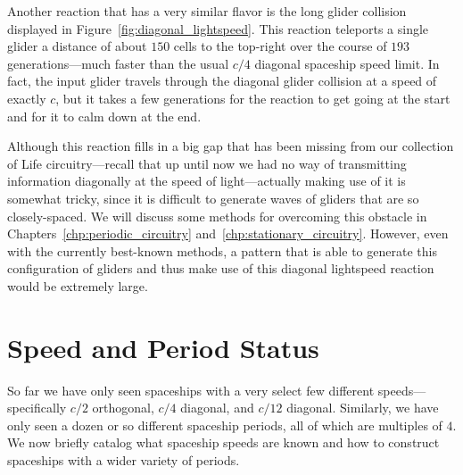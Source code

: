 Another reaction that has a very similar flavor is the long glider collision displayed in Figure~\ref{fig:diagonal_lightspeed}. This reaction teleports a single glider a distance of about $150$ cells to the top-right over the course of $193$ generations---much faster than the usual $c/4$ diagonal spaceship speed limit. In fact, the input glider travels through the diagonal glider collision at a speed of exactly $c$, but it takes a few generations for the reaction to get going at the start and for it to calm down at the end.

Although this reaction fills in a big gap that has been missing from our collection of Life circuitry---recall that up until now we had no way of transmitting information diagonally at the speed of light---actually making use of it is somewhat tricky, since it is difficult to generate waves of gliders that are so closely-spaced. We will discuss some methods for overcoming this obstacle in Chapters~\ref{chp:periodic_circuitry} and~\ref{chp:stationary_circuitry}. However, even with the currently best-known methods, a pattern that is able to generate this configuration of gliders and thus make use of this diagonal lightspeed reaction would be extremely large.



\section{Speed and Period Status}\label{sec:speed_period_status}

So far we have only seen spaceships with a very select few different speeds---specifically $c/2$ orthogonal, $c/4$ diagonal, and $c/12$ diagonal. Similarly, we have only seen a dozen or so different spaceship periods, all of which are multiples of $4$. We now briefly catalog what spaceship speeds are known and how to construct spaceships with a wider variety of periods.

